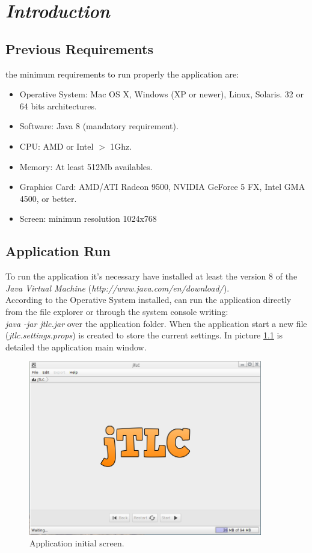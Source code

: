 \chapter{\textit{Introduction}}
\section{Previous Requirements}
the minimum requirements to run properly the application are:
\begin{itemize} \itemsep0pt \parskip0pt 
	\renewcommand{\labelitemi}{$\rightarrow$}
	\item Operative System: Mac OS X, Windows (XP or newer), Linux, Solaris. 32 or 64 bits architectures.
	\item Software: Java 8 (mandatory requirement).
	\item CPU: AMD or Intel {$>$} 1Ghz.
	\item Memory: At least 512Mb availables.
	\item Graphics Card: AMD/ATI Radeon 9500, NVIDIA GeForce 5 FX, Intel GMA 4500, or better.
	\item Screen: minimun resolution 1024x768
\end{itemize}
\newpage

\section{Application Run}
To run the application it's necessary have installed at least the version 8 of the \textit{Java Virtual Machine} (\emph{http://www.java.com/en/download/}).\\
According to the Operative System installed, can run the application directly from the file explorer or through the system console writing:\\ \emph{java -jar jtlc.jar} over the application folder.
When the application start a new file (\textit{jtlc.settings.props}) is created to store the current settings.
In picture \ref{fig:inicial} is detailed  the application main window.

\begin{figure}[H]
	\vspace{0cm}
	\centering
	\includegraphics[width=385px]{imagenes/main}
	\centering
	\vspace{-0.4cm}
	\caption{Application initial screen.}
	\label{fig:inicial}
	\vspace{-0.25cm}
\end{figure}
\newpage

